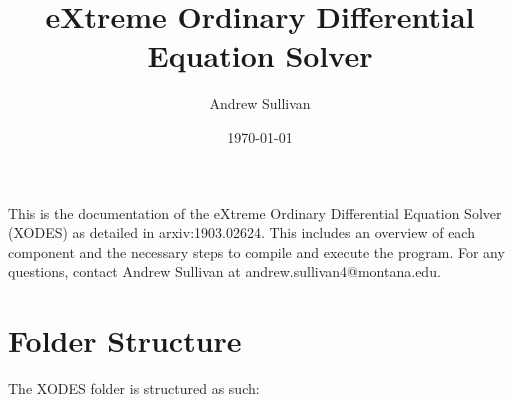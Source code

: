 \documentclass{article}
\begin{document}
\title{eXtreme Ordinary Differential Equation Solver}

\author{Andrew Sullivan}

\date{\today}

\maketitle

This is the documentation of the eXtreme Ordinary Differential Equation Solver (XODES) as detailed in arxiv:1903.02624. This includes an overview of each component and the necessary steps to compile and execute the program. For any questions, contact Andrew Sullivan at andrew.sullivan4@montana.edu.


\section{Folder Structure}
\label{sec:folderstruct}

The XODES folder is structured as such:
\end{document}
